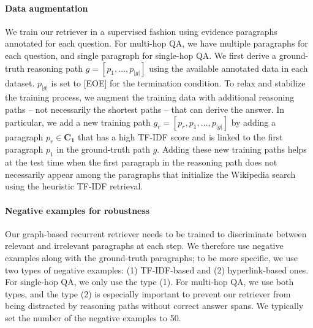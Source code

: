 \vspace{-2mm}\paragraph{Data augmentation}
We train our retriever in a supervised fashion using evidence paragraphs annotated for each question.
For multi-hop QA, we have multiple paragraphs for each question, and single paragraph for single-hop QA.
We first derive a ground-truth reasoning path $g=[p_1, \ldots, p_{|g|}]$ using the available annotated data in each dataset.
$p_{|g|}$ is set to [EOE] for the termination condition.
To relax and stabilize the training process, we augment the training data with additional  reasoning paths -- not necessarily the shortest paths -- that can derive the answer.
In particular, we add a new training path $g_r =[p_r, p_1, \ldots, p_{|g|}]$ by adding a paragraph $p_r\in \mathbf{C_1}$ that has a high TF-IDF score and is linked to the first paragraph $p_1$ in the ground-truth path $g$.
Adding these new training paths helps at the test time when the first paragraph in the reasoning path does not necessarily appear among the paragraphs that initialize the Wikipedia search using the heuristic TF-IDF retrieval. 

\vspace{-2mm}\paragraph{Negative examples for robustness}
Our graph-based recurrent retriever needs to be trained to discriminate between relevant and irrelevant paragraphs at each step.
We therefore use negative examples along with the ground-truth paragraphs; to be more specific, we use two types of negative examples: (1) TF-IDF-based and (2) hyperlink-based ones.
For single-hop QA, we only use the type (1).
For multi-hop QA, we use both types, and the type (2) is especially important to prevent our retriever from being distracted by reasoning paths without correct answer spans.
We typically set the number of the negative examples to 50.

